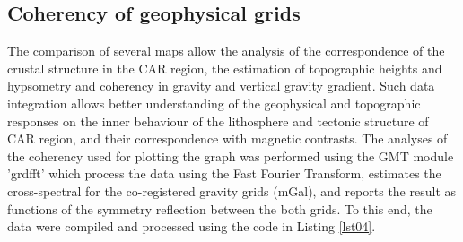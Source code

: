 \documentclass[minerals,article,submit,pdftex,moreauthors]{Definitions/mdpi}
\begin{document}
\subsection{Coherency of geophysical grids}

The comparison of several maps allow the analysis of the correspondence of the crustal structure in the CAR region, the estimation of topographic heights and hypsometry and coherency in gravity and vertical gravity gradient. Such data integration allows better understanding of the geophysical and topographic responses on the inner behaviour of the lithosphere and tectonic structure of CAR region, and their correspondence with magnetic contrasts. The analyses of the coherency used for plotting the graph was performed using the GMT module 'grdfft' which process the data using the Fast Fourier Transform, estimates the cross-spectral for the co-registered gravity grids (mGal), and reports the result as functions of the symmetry reflection between the both grids. To this end, the data were compiled and processed using the code in Listing \ref{lst04}. 
\end{document}
